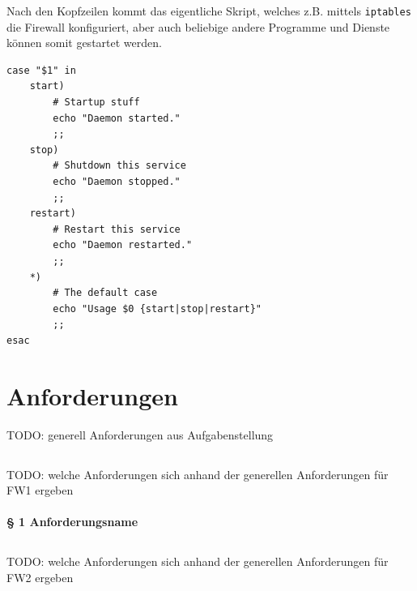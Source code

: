 Nach den Kopfzeilen kommt das eigentliche Skript, welches z.B. mittels
{\tt iptables} die Firewall konfiguriert, aber auch beliebige andere Programme
und Dienste können somit gestartet werden.

\begin{lstlisting}[label=lst:lsb-script,caption={Init Script LSB: Eigentliches Skript.}]
case "$1" in
    start)
        # Startup stuff
        echo "Daemon started."
        ;;
    stop)
        # Shutdown this service
        echo "Daemon stopped."
        ;;
    restart)
        # Restart this service
        echo "Daemon restarted."
        ;;
    *)
        # The default case
        echo "Usage $0 {start|stop|restart}"
        ;;
esac
\end{lstlisting}


\section{Anforderungen}

TODO: generell Anforderungen aus Aufgabenstellung

\subsection{\fwa}

TODO: welche Anforderungen sich anhand der generellen Anforderungen für FW1 ergeben

\paragraph{§ 1 Anforderungsname}

\subsection{\fwb}

TODO: welche Anforderungen sich anhand der generellen Anforderungen für FW2 ergeben

